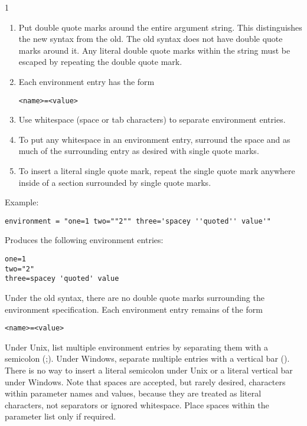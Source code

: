 \begin{ManPage}{\label{man-condor-submit}}{1}
\begin{description}
\begin{enumerate}

\item Put double quote marks around the entire argument string.  This
distinguishes the new syntax from the old.
The old syntax does not have double quote marks around it.
Any literal double quote marks within the string
must be escaped by repeating the double quote mark.

\item Each environment entry has the form

\begin{verbatim}
<name>=<value>
\end{verbatim}

\item Use whitespace (space or tab characters) to separate environment entries.

\item To put any whitespace in an environment entry, surround
the space and as much of the surrounding entry as desired with
single quote marks.

\item To insert a literal single quote mark, repeat the single quote mark
anywhere inside of a section surrounded by single quote marks.

\end{enumerate}

Example:

\begin{verbatim}
environment = "one=1 two=""2"" three='spacey ''quoted'' value'"
\end{verbatim}

Produces the following environment entries:

\begin{verbatim}
one=1
two="2"
three=spacey 'quoted' value
\end{verbatim}

Under the old syntax, there are no double quote marks surrounding the
environment specification.  Each environment entry remains of the form
\begin{verbatim}
<name>=<value>
\end{verbatim}
Under Unix, list multiple environment entries by separating them with
a semicolon (;).  Under Windows, separate multiple entries with a
vertical bar (\Bar).  There is no way to insert a literal semicolon
under Unix or a literal vertical bar under Windows.  Note that spaces
are accepted, but rarely desired, characters within parameter names
and values, because they are treated as literal characters, not
separators or ignored whitespace.  Place spaces within the parameter
list only if required.


\end{description}
\end{ManPage}
